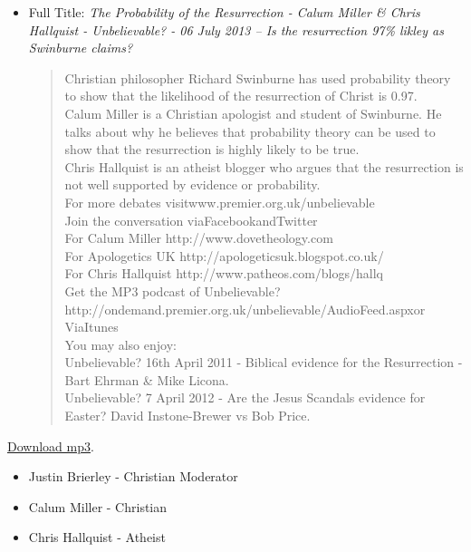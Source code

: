 \begin{itemize}
\item
  Full Title: \emph{The Probability of the Resurrection - Calum Miller
  \& Chris Hallquist - Unbelievable? - 06 July 2013 -- Is the
  resurrection 97\% likley as Swinburne claims?}

  \begin{quote}
  Christian philosopher Richard Swinburne has used probability theory to
  show that the likelihood of the resurrection of Christ is 0.97.\\
  Calum Miller is a Christian apologist and student of Swinburne. He
  talks about why he believes that probability theory can be used to
  show that the resurrection is highly likely to be true.\\ Chris
  Hallquist is an atheist blogger who argues that the resurrection is
  not well supported by evidence or probability.\\ For more debates
  visitwww.premier.org.uk/unbelievable\\ Join the conversation
  viaFacebookandTwitter\\ For Calum Miller http://www.dovetheology.com\\
  For Apologetics UK http://apologeticsuk.blogspot.co.uk/\\ For Chris
  Hallquist http://www.patheos.com/blogs/hallq\\ Get the MP3 podcast of
  Unbelievable?http://ondemand.premier.org.uk/unbelievable/AudioFeed.aspxor
  ViaItunes\\ You may also enjoy:\\ Unbelievable? 16th April 2011 -
  Biblical evidence for the Resurrection - Bart Ehrman \& Mike Licona.\\
  Unbelievable? 7 April 2012 - Are the Jesus Scandals evidence for
  Easter? David Instone-Brewer vs Bob Price.
  \end{quote}
\end{itemize}

\href{http://media.premier.org.uk/unbelievable/d8367d64-5f9f-496f-967a-ff4659e83027.mp3}{Download
mp3}.

\begin{itemize}
\itemsep1pt\parskip0pt
\item
  Justin Brierley - Christian Moderator
\item
  Calum Miller - Christian
\item
  Chris Hallquist - Atheist
\end{itemize}

